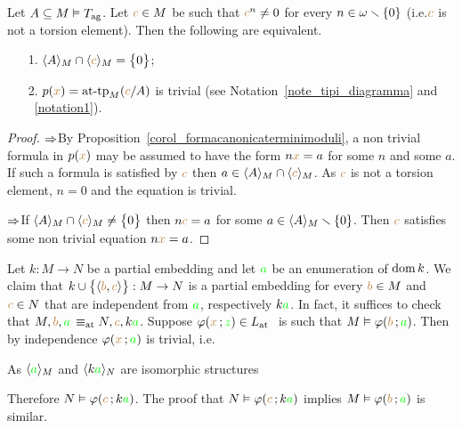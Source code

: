 \documentclass[creche.tex]{subfiles}
\begin{document}
\begin{proposition}
Let $A\subseteq M\models T_{\rm ag}$. Let ${\mr c}\in M$ be such that ${\mr c}^n\neq0$ for every $n\in\omega\sm\{0\}$ (i.e.\@ ${\mr c}$ is not a torsion element). Then the following are equivalent.
\begin{itemize}
 \item[1.] $\<A\>_M\cap\<{\mr c}\>_M=\big\{0\big\}$;
 \item[2.] $p({\mr x})=\attp_M({\mr c}/A)$ is trivial (see Notation~\ref{note_tipi_diagramma} and ~\ref{notation1}).
\end{itemize}
\end{proposition}
\begin{proof}
$\IMP$\quad By Proposition~\ref{corol_formacanonicaterminimoduli}, a non trivial formula in $p({\mr x})$ may be assumed to have the form $n{\mr x}=a$ for some $n$ and some $a$. If such a formula is satisfied by ${\mr c}$ then $a\in\<A\>_M\cap\<{\mr c}\>_M$. As ${\mr c}$ is not a torsion element, $n=0$ and the equation is trivial.

$\IMP$\quad If $\<A\>_M\cap\<{\mr c}\>_M\neq\big\{0\big\}$ then $n{\mr c}=a$ for some $a\in\<A\>_M\sm\{0\}$. Then ${\mr c}$ satisfies some non trivial equation $n{\mr x}=a$.
\end{proof}


\begin{remark}\label{oss_liberi_qf}
Let $k:M\to N$ be a partial embedding and let ${\gr a}$ be an enumeration of $\dom k$. We claim that  $k\cup\big\{\<{\mr b},{\mr c}\>\big\}:M\to N$ is a partial embedding for every ${\mr b}\in M$ and ${\mr c}\in N$ that are independent from ${\gr a}$, respectively $k{\gr a}$. In fact, it suffices to check that $M,{\mr b},{\gr a}\,\equiv_{\rm at}N, {\mr c},k{\gr a}$. Suppose $\phi({\mr x}\,;{\gr z})\in\atL$ \ is such that $M\models\phi({\mr b}\,;{\gr a})$. Then by independence $\phi({\mr x}\,;{\gr a})$ is trivial, i.e.


As $\<{\gr a}\>_M$ and  $\<k{\gr a}\>_N$ are isomorphic structures 


Therefore $N\models\phi({\mr c}\,;k{\gr a})$. The proof that $N\models\phi({\mr c}\,;k{\gr a})$ implies $M\models\phi({\mr b}\,;{\gr a})$ is similar.\QED 
\end{remark}
\end{document}
